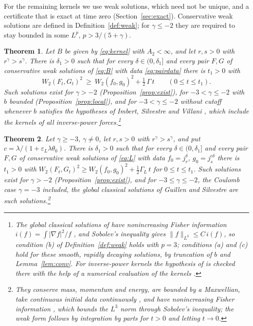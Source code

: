 \documentclass[11pt]{amsart}
\newtheorem{mainthm}{Theorem}
\theoremstyle{definition}
\begin{document}
For the remaining kernels we use weak solutions, which need not be unique, and a certificate that is exact at time zero (Section~\ref{sec:exact}). Conservative weak solutions are defined in Definition~\ref{def:weak}; for $\gamma\le-2$ they are required to stay bounded in some $L^p$, $p>3/(5+\gamma)$.

\begin{mainthm}\label{thm:C}
Let $B$ be given by \eqref{eq:kernel} with $A_2<\infty$, and let $r,s>0$ with $r^\gamma>s^\gamma$. There is $\delta_1>0$ such that for every $\delta\in(0,\delta_1]$ and every pair $F,G$ of conservative weak solutions of \eqref{eq:B} with data \eqref{eq:pairdata} there is $t_1>0$ with
\[
W_2(F_t,G_t)^2\ \ge\ W_2(f_0,g_0)^2+\tfrac12\,\Gamma\,t\qquad(0\le t\le t_1).
\]
Such solutions exist for $\gamma>-2$ (Proposition~\ref{prop:exist}), for $-3<\gamma\le-2$ with $b$ bounded (Proposition~\ref{prop:local}), and for $-3<\gamma\le-2$ without cutoff whenever $b$ satisfies the hypotheses of Imbert, Silvestre and Villani \cite[Theorems~1.2 and~1.6]{ISV25}, which include the kernels of all inverse-power forces.\footnote{The global classical solutions of \cite[Theorem~1.6]{ISV25} have nonincreasing Fisher information $i(f)=\int|\nabla f|^2/f$ \cite[Theorem~1.2]{ISV25}, and Sobolev's inequality gives $\|f\|_{L^3}\le C\,i(f)$, so condition (b) of Definition~\ref{def:weak} holds with $p=3$; conditions (a) and (c) hold for these smooth, rapidly decaying solutions, by truncation of $b$ and Lemma~\ref{lem:conv}. For inverse-power kernels the hypothesis of \cite[Theorem~1.2]{ISV25} is checked there with the help of a numerical evaluation of the kernels \cite[Theorem~1.1 and Appendix~A]{ISV25}.}
\end{mainthm}

\begin{mainthm}\label{thm:D}
Let $\gamma\ge-3$, $\gamma\ne0$, let $r,s>0$ with $r^\gamma>s^\gamma$, and put $c=\lambda/(1+\varepsilon_L\lambda\theta_0)$. There is $\delta_1>0$ such that for every $\delta\in(0,\delta_1]$ and every pair $F,G$ of conservative weak solutions of \eqref{eq:L} with data $f_0=j^\delta_r$, $g_0=j^{c\delta}_s$ there is $t_1>0$ with $W_2(F_t,G_t)^2\ge W_2(f_0,g_0)^2+\frac12\Gamma_L\,t$ for $0\le t\le t_1$. Such solutions exist for $\gamma>-2$ (Proposition~\ref{prop:exist}), and for $-3\le\gamma\le-2$, the Coulomb case $\gamma=-3$ included, the global classical solutions of Guillen and Silvestre \cite[Theorem~1.2]{GS25} are such solutions.\footnote{They conserve mass, momentum and energy, are bounded by a Maxwellian, take continuous initial data continuously \cite[Theorem~2.1]{GS25}, and have nonincreasing Fisher information \cite[Theorem~1.2]{GS25}, which bounds the $L^3$ norm through Sobolev's inequality; the weak form follows by integration by parts for $t>0$ and letting $t\to0$.}
\end{mainthm}
\end{document}
